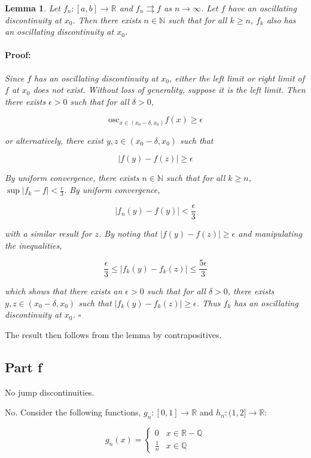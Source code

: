 \documentclass{article}
\newenvironment{proof}{\paragraph{Proof:}}{\hfill$\square$}
\newtheorem{lemma}[theorem]{Lemma}
\newcommand{\R}{\mathbb{R}}
\newcommand{\Q}{\mathbb{Q}}
\newcommand{\N}{\mathbb{N}}
\newcommand{\osc}{\text{osc}}
\begin{document}
\begin{lemma}
Let $f_n: [a, b] \rightarrow \R$ and $f_n \rightrightarrows f$ as $n \rightarrow \infty$. Let $f$ have an oscillating discontinuity at $x_0$. Then there exists $n \in \N$ such that for all $k \geq n$, $f_k$ also has an oscillating discontinuity at $x_0$.

\begin{proof}
Since $f$ has an oscillating discontinuity at $x_0$, either the left limit or right limit of $f$ at $x_0$ does not exist. Without loss of generality, suppose it is the left limit. Then there exists $\epsilon > 0$ such that for all $\delta > 0$,

\[
\osc_{x \in (x_0 - \delta, x_0)} f(x) \geq \epsilon
\]

or alternatively, there exist $y, z \in (x_0 - \delta, x_0)$ such that

\[
|f(y) - f(z)| \geq \epsilon
\]

By uniform convergence, there exists $n \in \N$ such that for all $k \geq n$, $\sup |f_k - f| < \frac{\epsilon}{3}$. By uniform convergence,

\[
|f_n(y) - f(y)| < \frac{\epsilon}{3}
\]

with a similar result for $z$. By noting that $|f(y) - f(z)| \geq \epsilon$ and manipulating the inequalities,

\[
\frac{\epsilon}{3} \leq |f_k(y) - f_k(z)| \leq \frac{5\epsilon}{3}
\]

which shows that there exists an $\epsilon > 0$ such that for all $\delta > 0$, there exists $y, z \in (x_0 - \delta, x_0)$ such that $|f_k(y) - f_k(z)| \geq \epsilon$. Thus $f_k$ has an oscillating discontinuity at $x_0$.
\end{proof}
\end{lemma}

The result then follows from the lemma by contrapositives. 

\subsection*{Part f}

No jump discontinuities.

No. Consider the following functions, $g_n: [0, 1] \rightarrow \R$ and $h_n: (1, 2] \rightarrow \R$:

\[
g_n(x) = 
\begin{cases}
0 & x \in \R - \Q \\
\frac{1}{n} & x \in \Q
\end{cases}
\]
\end{document}
